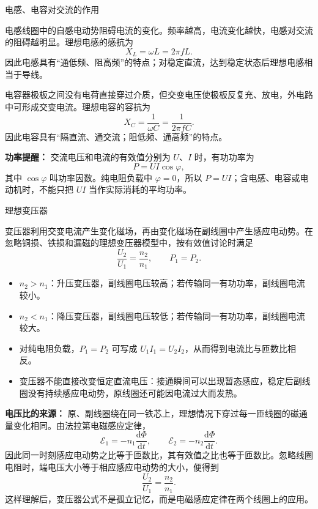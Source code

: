 \begin{conceptbox}{电感、电容对交流的作用}

电感线圈中的自感电动势阻碍电流的变化。频率越高，电流变化越快，电感对交流的阻碍越明显。理想电感的感抗为
\[
\boxed{X_L=\omega L=2\pi fL}.
\]
因此电感具有“通低频、阻高频”的特点；对稳定直流，达到稳定状态后理想电感相当于导线。

电容器极板之间没有电荷直接穿过介质，但交变电压使极板反复充、放电，外电路中可形成交变电流。理想电容的容抗为
\[
\boxed{X_C=\frac{1}{\omega C}=\frac{1}{2\pi fC}}.
\]
因此电容具有“隔直流、通交流；阻低频、通高频”的特点。

\begin{center}


\label{fig:ac-inductor-capacitor}
\end{center}

\textbf{功率提醒：} 交流电压和电流的有效值分别为 $U$、$I$ 时，有功功率为
\[
\boxed{P=UI\cos\varphi},
\]
其中 $\cos\varphi$ 叫功率因数。纯电阻负载中 $\varphi=0$，所以 $P=UI$；含电感、电容或电动机时，不能只把 $UI$ 当作实际消耗的平均功率。

\end{conceptbox}

\begin{conceptbox}{理想变压器}

变压器利用交变电流产生变化磁场，再由变化磁场在副线圈中产生感应电动势。在忽略铜损、铁损和漏磁的理想变压器模型中，按有效值讨论时满足
\[
\boxed{\frac{U_2}{U_1}=\frac{n_2}{n_1}},\qquad
\boxed{P_1=P_2}.
\]

\begin{center}


\label{fig:transformer-principle}
\end{center}

\begin{itemize}
  \item $n_2>n_1$：升压变压器，副线圈电压较高；若传输同一有功功率，副线圈电流较小。
  \item $n_2<n_1$：降压变压器，副线圈电压较低；若传输同一有功功率，副线圈电流较大。
  \item 对纯电阻负载，$P_1=P_2$ 可写成 $U_1I_1=U_2I_2$，从而得到电流比与匝数比相反。
  \item 变压器不能直接改变恒定直流电压：接通瞬间可以出现暂态感应，稳定后副线圈没有持续感应电动势，原线圈还可能因电流过大而发热。
\end{itemize}

\textbf{电压比的来源：} 原、副线圈绕在同一铁芯上，理想情况下穿过每一匝线圈的磁通量变化相同。由法拉第电磁感应定律，
\[
\mathcal E_1=-n_1\frac{\mathrm d\Phi}{\mathrm dt},\qquad
\mathcal E_2=-n_2\frac{\mathrm d\Phi}{\mathrm dt}.
\]
因此同一时刻感应电动势之比等于匝数比，其有效值之比也等于匝数比。忽略线圈电阻时，端电压大小等于相应感应电动势的大小，便得到
\[
\frac{U_2}{U_1}=\frac{n_2}{n_1}.
\]
这样理解后，变压器公式不是孤立记忆，而是电磁感应定律在两个线圈上的应用。

\end{conceptbox}

